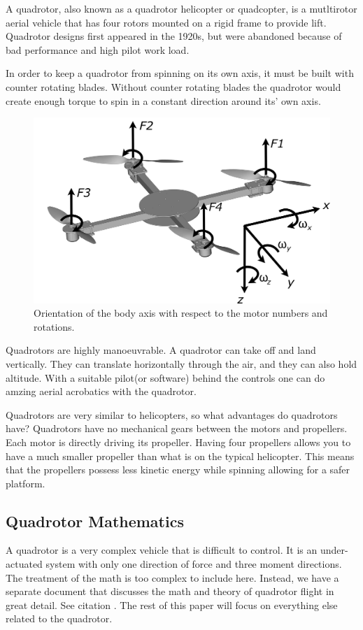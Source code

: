 \documentclass{article}
\numberwithin{equation}{section} %
\begin{document}
A quadrotor, also known as a quadrotor helicopter or quadcopter, is a mutltirotor aerial vehicle that has four rotors mounted on a rigid frame to provide lift. Quadrotor designs first appeared in the 1920s, but were abandoned because of bad performance and high pilot work load.

In order to keep a quadrotor from spinning on its own axis, it must be built with counter rotating blades. Without counter rotating blades the quadrotor would create enough torque to spin in a constant direction around its' own axis.

\begin{figure}[h!]
  \centering
	\includegraphics[scale=.05]{reference_frame_diagram.jpg}
  \caption{Orientation of the body axis with respect to the motor numbers and rotations.}
\end{figure}  

Quadrotors are highly manoeuvrable. A quadrotor can take off and land vertically. They can translate horizontally through the air, and they can also hold altitude. With a suitable pilot(or software) behind the controls one can do amzing aerial acrobatics with the quadrotor.

Quadrotors are very similar to helicopters, so what advantages do quadrotors have? Quadrotors have no mechanical gears between the motors and propellers. Each motor is directly driving its propeller. Having four propellers allows you to have a much smaller propeller than what is on the typical helicopter. This means that the propellers possess less kinetic energy while spinning allowing for a safer platform.

\subsection{Quadrotor Mathematics}
A quadrotor is a very complex vehicle that is difficult to control. It is an under-actuated system with only one direction of force and three moment directions. The treatment of the math is too complex to include here. Instead, we have a separate document that discusses the math and theory of quadrotor flight in great detail. See citation \cite{anzhelka_math}. The rest of this paper will focus on everything else related to the quadrotor.
\end{document}
